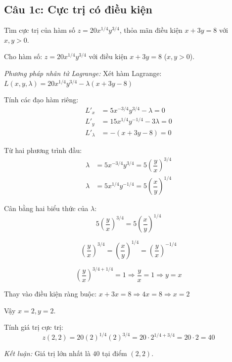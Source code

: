 \subsection*{Câu 1c: Cực trị có điều kiện}

\begin{questionbox}
Tìm cực trị của hàm số $z = 20x^{1/4}y^{3/4}$, thỏa mãn điều kiện $x + 3y = 8$ với $x, y > 0$.
\end{questionbox}

\begin{solution}
Cho hàm số: $z = 20x^{1/4}y^{3/4}$ với điều kiện $x + 3y = 8$ ($x, y > 0$).

\textit{Phương pháp nhân tử Lagrange:}
Xét hàm Lagrange: $L(x, y, \lambda) = 20x^{1/4}y^{3/4} - \lambda(x + 3y - 8)$

\textit{} Tính các đạo hàm riêng:
\begin{align*}
    L'_x &= 5x^{-3/4}y^{3/4} - \lambda = 0 \\
    L'_y &= 15x^{1/4}y^{-1/4} - 3\lambda = 0 \\
    L'_\lambda &= -(x + 3y - 8) = 0
\end{align*}

\textit{} Từ hai phương trình đầu:
\begin{align*}
    \lambda &= 5x^{-3/4}y^{3/4} = 5\left(\dfrac{y}{x}\right)^{3/4} \\
    \lambda &= 5x^{1/4}y^{-1/4} = 5\left(\dfrac{x}{y}\right)^{1/4}
\end{align*}

Cân bằng hai biểu thức của $\lambda$:
\[
    5\left(\dfrac{y}{x}\right)^{3/4} = 5\left(\dfrac{x}{y}\right)^{1/4}
\]

\[
    \left(\dfrac{y}{x}\right)^{3/4} = \left(\dfrac{x}{y}\right)^{1/4} = \left(\dfrac{y}{x}\right)^{-1/4}
\]

\[
    \left(\dfrac{y}{x}\right)^{3/4 + 1/4} = 1 \Rightarrow \dfrac{y}{x} = 1 \Rightarrow y = x
\]

\textit{} Thay vào điều kiện ràng buộc:
$x + 3x = 8 \Rightarrow 4x = 8 \Rightarrow x = 2$

Vậy $x = 2, y = 2$.

\textit{} Tính giá trị cực trị:
\[
    z(2, 2) = 20(2)^{1/4}(2)^{3/4} = 20 \cdot 2^{1/4 + 3/4} = 20 \cdot 2 = 40
\]

\textit{Kết luận:} Giá trị lớn nhất là $40$ tại điểm $(2, 2)$.
\end{solution}

